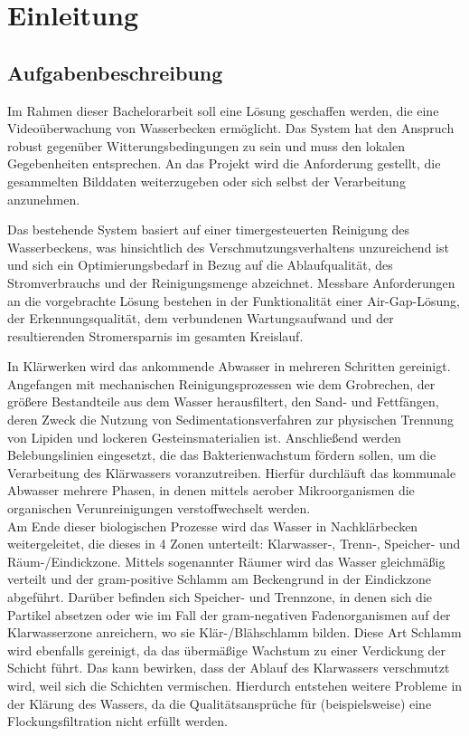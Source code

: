 
\chapter{Einleitung} \label{Einleitung}

\section{Aufgabenbeschreibung} \label{Aufgabenbeschreibung}

Im Rahmen dieser Bachelorarbeit soll eine Lösung geschaffen werden, die eine Videoüberwachung von Wasserbecken ermöglicht. Das System hat den Anspruch robust gegenüber Witterungsbedingungen zu sein und muss den lokalen Gegebenheiten entsprechen. An das Projekt wird die Anforderung gestellt, die gesammelten Bilddaten weiterzugeben oder sich selbst der Verarbeitung anzunehmen.

Das bestehende System basiert auf einer timergesteuerten Reinigung des Wasserbeckens, was hinsichtlich des Verschmutzungsverhaltens unzureichend ist und sich ein Optimierungsbedarf in Bezug auf die Ablaufqualität, des Stromverbrauchs und der Reinigungsmenge abzeichnet. Messbare Anforderungen an die vorgebrachte Lösung bestehen in der Funktionalität einer Air-Gap-Lösung, der Erkennungsqualität, dem verbundenen Wartungsaufwand und der resultierenden Stromersparnis im gesamten Kreislauf.

In Klärwerken wird das ankommende Abwasser in mehreren Schritten gereinigt. Angefangen mit mechanischen Reinigungsprozessen wie dem Grobrechen, der größere Bestandteile aus dem Wasser herausfiltert, den Sand- und Fettfängen, deren Zweck die Nutzung von Sedimentationsverfahren zur physischen Trennung von Lipiden und lockeren Gesteinsmaterialien ist. Anschließend werden Belebungslinien eingesetzt, die das Bakterienwachstum fördern sollen, um die Verarbeitung des Klärwassers voranzutreiben. Hierfür durchläuft das kommunale Abwasser mehrere Phasen, in denen mittels aerober Mikroorganismen die organischen Verunreinigungen verstoffwechselt werden. \cite{Jenkins_2004, Engelhart_2020} \\
Am Ende dieser biologischen Prozesse wird das Wasser in Nachklärbecken weitergeleitet, die dieses in 4 Zonen unterteilt: Klarwasser-, Trenn-, Speicher- und Räum-/Eindickzone. Mittels sogenannter Räumer wird das Wasser gleichmäßig verteilt und der gram-positive Schlamm am Beckengrund in der Eindickzone abgeführt. Darüber befinden sich Speicher- und Trennzone, in denen sich die Partikel absetzen oder wie im Fall der gram-negativen Fadenorganismen auf der Klarwasserzone anreichern, wo sie Klär-/Blähschlamm bilden. Diese Art Schlamm wird ebenfalls gereinigt, da das übermäßige Wachstum zu einer Verdickung der Schicht führt. Das kann bewirken, dass der Ablauf des Klarwassers verschmutzt wird, weil sich die Schichten vermischen. Hierdurch entstehen weitere Probleme in der Klärung des Wassers, da die Qualitätsansprüche für (beispielsweise) eine Flockungsfiltration nicht erfüllt werden. \\ \\


